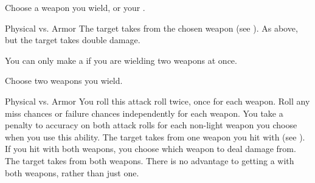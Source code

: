         \begin{ability}
            \begin{spelltargetinginfo}
                \spellspecial Choose a weapon you wield, or your .
            \end{spelltargetinginfo}
            \begin{spelleffects}
                \begin{spellattack}{Physical vs. Armor}
                    \spellsuccess The target takes  from the chosen weapon (see ).
                    \spellcritical As above, but the target takes double damage.
                \end{spellattack}
            \end{spelleffects}
        \end{ability}

        \label{Dual Strike}
        You can only make a  if you are wielding two weapons at once.
        \begin{ability}
            \begin{spelltargetinginfo}
                \spellspecial Choose two weapons you wield.
            \end{spelltargetinginfo}
            \begin{spelleffects}
                \begin{spellattack}{Physical vs. Armor}
                    \spellspecial You roll this attack roll twice, once for each weapon.
                    Roll any miss chances or failure chances independently for each weapon.
                    You take a  penalty to accuracy on both attack rolls for each non-light weapon you choose when you use this ability.
                    \spellsuccess The target takes  from one weapon you hit with (see ).
                    If you hit with both weapons, you choose which weapon to deal damage from.
                    \spellcritical The target takes  from both weapons.
                    There is no advantage to getting a  with both weapons, rather than just one.
                \end{spellattack}
            \end{spelleffects}
        \end{ability}

